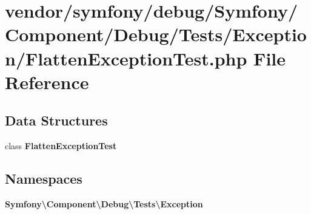 \section{vendor/symfony/debug/\+Symfony/\+Component/\+Debug/\+Tests/\+Exception/\+Flatten\+Exception\+Test.php File Reference}
\label{_flatten_exception_test_8php}
\subsection*{Data Structures}
\begin{DoxyCompactItemize}
\item 
class {\bf Flatten\+Exception\+Test}
\end{DoxyCompactItemize}
\subsection*{Namespaces}
\begin{DoxyCompactItemize}
\item 
 {\bf Symfony\textbackslash{}\+Component\textbackslash{}\+Debug\textbackslash{}\+Tests\textbackslash{}\+Exception}
\end{DoxyCompactItemize}
